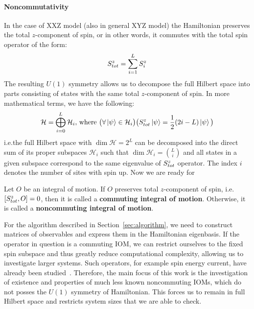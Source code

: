 \paragraph{Noncommutativity}In the case of XXZ model (also in general XYZ model) the Hamiltonian preserves the total \(z\)-component of spin,
or in other words, it commutes with the total spin operator of the form:
\begin{equation}
  S^{z}_{tot} = \sum_{i = 1}^{L} S^{z}_i
  \label{eq:magnetization}
\end{equation}
The resulting \(U(1)\) symmetry allows us to decompose the full Hilbert space into parts consisting of states with the same total \(z\)-component
of spin. In more mathematical terms, we have the following:
\begin{equation*}
  \mathcal{H} = \bigoplus_{i = 0}^{L} \mathcal{H}_i \text{, where } \big(\forall \ket{\psi} \in \mathcal{H}_i \big) \big(S^{z}_{tot} \ket{\psi} = \frac{1}{2}(2i-L) \ket{\psi} \big)
\end{equation*}
i.e.\;the full Hilbert space with \(\dim{\mathcal{H}} = 2^L\) can be decomposed into the direct sum of its proper subspaces
\(\mathcal{H}_i\) such that \(\dim{\mathcal{H}_i} = \binom{L}{i}\) and all states in a given subspace correspond to the same
eigenvalue of \(S^{z}_{tot}\) operator. The index \(i\) denotes the number of sites with spin up.
Now we are ready for
\begin{definition}
  Let \(O\) be an integral of motion. If \(O\) preserves total \(z\)-component of spin, i.e.
  \(\comm{\Sz_{tot}}{O} = 0\), then it is called a \textbf{commuting integral of motion}.
  Otherwise, it is called a \textbf{noncommuting integral of motion}.\label{def:noncomm def}
\end{definition}
For the algorithm described in Section~\ref{sec:algorithm}, we need to construct matrices of
observables and express them in the Hamiltonian eigenbasis. If the operator in question is a
commuting IOM, we can restrict ourselves to the fixed spin subspace and thus greatly reduce
computational complexity, allowing us to investigate larger systems. Such operators, for example
spin energy current, have already been studied~\autocite{Mierzejewski2015Approx}. Therefore,
the main focus of this work is the investigation of existence and properties of much less known
noncommuting IOMs, which do not posses the \(U(1)\) symmetry of Hamiltonian. 
This forces us to remain in full Hilbert space and restricts system sizes that we are able to check.


